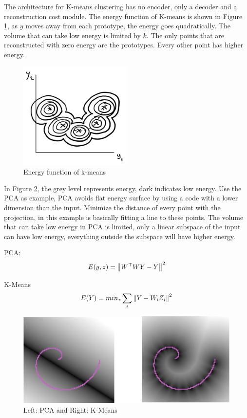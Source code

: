 The architecture for K-means clustering has no encoder, only a decoder and a reconstruction cost module. 
The energy function of K-means is shown in Figure \ref{figure3}, as $y$ moves away from each prototype, the energy goes quadratically. 
The volume that can take low energy is limited by $k$. 
The only points that are reconstructed with zero energy are the prototypes. Every other point has higher energy.

 \begin{figure}[H]
    \centering
    \includegraphics[width=0.5\textwidth]{figs/pic9.png}
    \caption{Energy function of k-means}
    \label{figure3}
\end{figure}

In Figure \ref{figure4}, the grey level represents energy, dark indicates low energy. 
Use the PCA as example, PCA avoids flat energy surface by using a code with a lower dimension than the input. 
Minimize the distance of every point with the projection, in this example is basically fitting a line to these points. 
The volume that can take low energy in PCA is limited, only a linear subspace of the input can have low energy, everything outside the subspace will have higher energy. 

PCA:
\begin{equation}
E(y,z) =  \norm{W^\top WY -Y}^2
\end{equation}

K-Means
\begin{equation}
E(Y) =  min_z \sum_i\norm{Y-W_iZ_i}^2
\end{equation}

\begin{figure}[H]
    \centering
    \includegraphics[width=\textwidth]{figs/pic1.png}
    \caption{Left: PCA and Right: K-Means}
    \label{figure4}
\end{figure}
   
